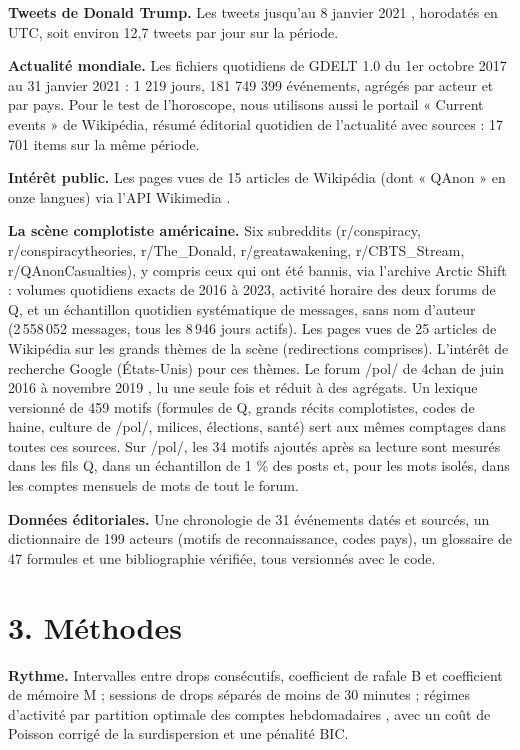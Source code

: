 \documentclass[11pt,a4paper]{article}
\begin{document}
\textbf{Tweets de Donald Trump.} Les tweets jusqu'au 8 janvier 2021 \parencite{codebreaker2021donald}, horodatés en UTC, soit environ 12,7 tweets par jour sur la période.

\textbf{Actualité mondiale.} Les fichiers quotidiens de GDELT 1.0 \parencite{gdeltproject} du 1er octobre 2017 au 31 janvier 2021 : 1 219 jours, 181 749 399 événements, agrégés par acteur et par pays. Pour le test de l'horoscope, nous utilisons aussi le portail « Current events » de Wikipédia, résumé éditorial quotidien de l'actualité avec sources : 17 701 items sur la même période.

\textbf{Intérêt public.} Les pages vues de 15 articles de Wikipédia (dont « QAnon » en onze langues) via l'API Wikimedia \parencite{wikimediapageviews}.

\textbf{La scène complotiste américaine.} Six subreddits (r/conspiracy, r/conspiracytheories, r/The\_Donald, r/greatawakening, r/CBTS\_Stream, r/QAnonCasualties), y compris ceux qui ont été bannis, via l'archive Arctic Shift : volumes quotidiens exacts de 2016 à 2023, activité horaire des deux forums de Q, et un échantillon quotidien systématique de messages, sans nom d'auteur (2 558 052 messages, tous les 8 946 jours actifs). Les pages vues de 25 articles de Wikipédia sur les grands thèmes de la scène (redirections comprises). L'intérêt de recherche Google (États-Unis) pour ces thèmes. Le forum /pol/ de 4chan de juin 2016 à novembre 2019 \parencite{papasavva2020raiders}, lu une seule fois et réduit à des agrégats. Un lexique versionné de 459 motifs (formules de Q, grands récits complotistes, codes de haine, culture de /pol/, milices, élections, santé) sert aux mêmes comptages dans toutes ces sources. Sur /pol/, les 34 motifs ajoutés après sa lecture sont mesurés dans les fils Q, dans un échantillon de 1 \% des posts et, pour les mots isolés, dans les comptes mensuels de mots de tout le forum.

\textbf{Données éditoriales.} Une chronologie de 31 événements datés et sourcés, un dictionnaire de 199 acteurs (motifs de reconnaissance, codes pays), un glossaire de 47 formules et une bibliographie vérifiée, tous versionnés avec le code.

\section*{3. Méthodes}

\textbf{Rythme.} Intervalles entre drops consécutifs, coefficient de rafale B et coefficient de mémoire M \parencite{goh2008burstiness} ; sessions de drops séparés de moins de 30 minutes ; régimes d'activité par partition optimale des comptes hebdomadaires \parencite{jackson2005optimal,killick2012pelt}, avec un coût de Poisson corrigé de la surdispersion et une pénalité BIC.
\end{document}
